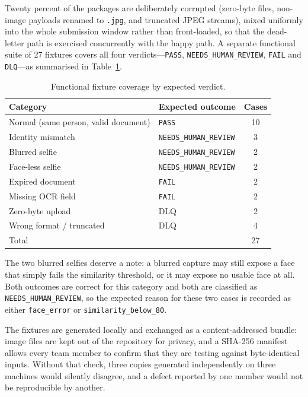 Twenty percent of the packages are deliberately corrupted (zero-byte files,
non-image payloads renamed to \texttt{.jpg}, and truncated JPEG streams), mixed
uniformly into the whole submission window rather than front-loaded, so that the
dead-letter path is exercised concurrently with the happy path. A separate
functional suite of 27 fixtures covers all four verdicts---\texttt{PASS},
\texttt{NEEDS\_HUMAN\_REVIEW}, \texttt{FAIL} and \texttt{DLQ}---as
summarised in Table~\ref{tab:fixtures}.

\begin{table}[htbp]
  \centering
  \small
  \caption{Functional fixture coverage by expected verdict.}
  \label{tab:fixtures}
  \begin{tabular}{llc}
    \toprule
    Category & Expected outcome & Cases \\
    \midrule
    Normal (same person, valid document) & \texttt{PASS} & 10 \\
    Identity mismatch & \texttt{NEEDS\_HUMAN\_REVIEW} & 3 \\
    Blurred selfie & \texttt{NEEDS\_HUMAN\_REVIEW} & 2 \\
    Face-less selfie & \texttt{NEEDS\_HUMAN\_REVIEW} & 2 \\
    Expired document & \texttt{FAIL} & 2 \\
    Missing OCR field & \texttt{FAIL} & 2 \\
    Zero-byte upload & DLQ & 2 \\
    Wrong format / truncated & DLQ & 4 \\
    \midrule
    Total & & 27 \\
    \bottomrule
  \end{tabular}
\end{table}

The two blurred selfies deserve a note: a blurred capture may still expose a face
that simply fails the similarity threshold, or it may expose no usable face at
all. Both outcomes are correct for this category and both are classified as
\texttt{NEEDS\_HUMAN\_REVIEW}, so the expected reason for these two cases is
recorded as either \texttt{face\_error} or \texttt{similarity\_below\_80}.

The fixtures are generated locally and exchanged as a content-addressed bundle:
image files are kept out of the repository for privacy, and a SHA-256 manifest
allows every team member to confirm that they are testing against byte-identical
inputs. Without that check, three copies generated independently on three
machines would silently disagree, and a defect reported by one member would not
be reproducible by another.

